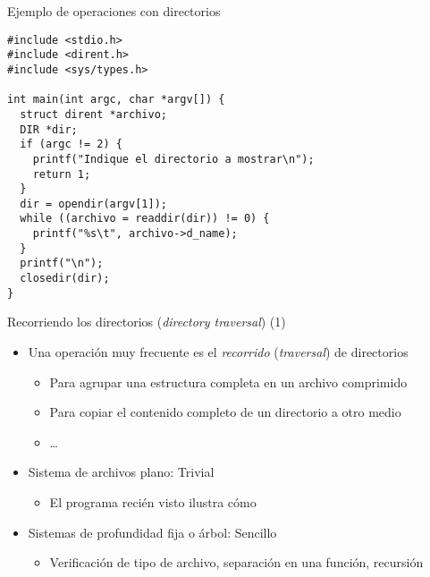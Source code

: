 \documentclass[presentation]{beamer}
\begin{document}
\begin{frame}[label={sec:org583452a},fragile]{Ejemplo de operaciones con directorios}
 \begin{verbatim}
#include <stdio.h>
#include <dirent.h>
#include <sys/types.h>

int main(int argc, char *argv[]) {
  struct dirent *archivo;
  DIR *dir;
  if (argc != 2) {
    printf("Indique el directorio a mostrar\n");
    return 1;
  }
  dir = opendir(argv[1]);
  while ((archivo = readdir(dir)) != 0) {
    printf("%s\t", archivo->d_name);
  }
  printf("\n");
  closedir(dir);
}
\end{verbatim}
\end{frame}

\begin{frame}[label={sec:org1c4df78}]{Recorriendo los directorios (\emph{directory traversal}) (1)}
\begin{itemize}
\item Una operación muy frecuente es el \emph{recorrido} (\emph{traversal}) de
directorios
\begin{itemize}
\item Para agrupar una estructura completa en un archivo comprimido
\item Para copiar el contenido completo de un directorio a otro medio
\item \ldots{}
\end{itemize}
\item Sistema de archivos plano: Trivial
\begin{itemize}
\item El programa recién visto ilustra cómo
\end{itemize}
\end{itemize}
\pause
\begin{itemize}
\item Sistemas de profundidad fija o árbol: Sencillo
\begin{itemize}
\item Verificación de tipo de archivo, separación en una función,
recursión
\end{itemize}
\end{itemize}
\end{frame}
\end{document}
